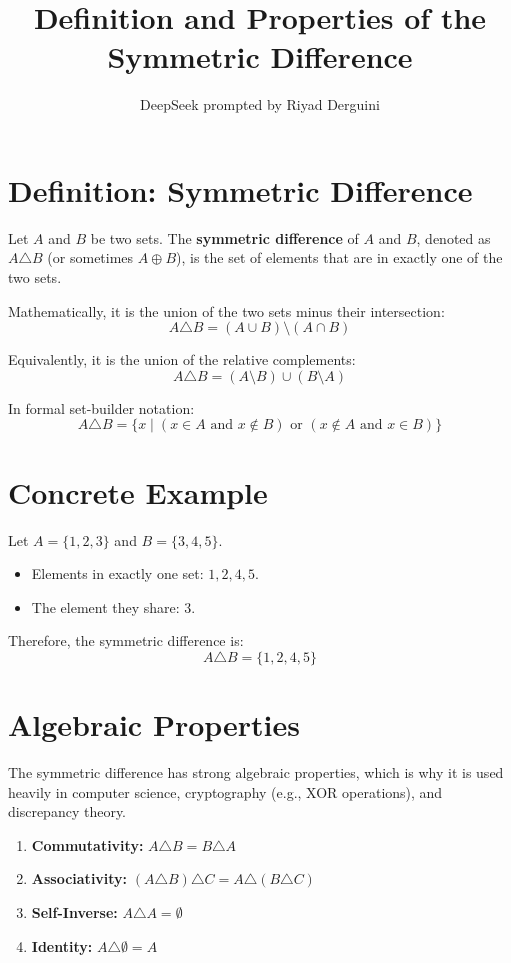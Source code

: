 \documentclass[11pt]{article}
\title{Definition and Properties of the Symmetric Difference}
\author{DeepSeek prompted by Riyad Derguini}
\date{}
\begin{document}
\maketitle

\section{Definition: Symmetric Difference}

Let \(A\) and \(B\) be two sets. The \textbf{symmetric difference} of \(A\) and \(B\), denoted as \(A \triangle B\) (or sometimes \(A \oplus B\)), is the set of elements that are in exactly one of the two sets. 

Mathematically, it is the union of the two sets minus their intersection:
\[
 A \triangle B = (A \cup B) \setminus (A \cap B) 
\]

Equivalently, it is the union of the relative complements:
\[
 A \triangle B = (A \setminus B) \cup (B \setminus A) 
\]

In formal set-builder notation:
\[
 A \triangle B = \{ x \mid (x \in A \text{ and } x \notin B) \text{ or } (x \notin A \text{ and } x \in B) \} 
\]

\hrulefill

\section{Concrete Example}

Let \(A = \{1, 2, 3\}\) and \(B = \{3, 4, 5\}\).
\begin{itemize}
    \item Elements in exactly one set: \(1, 2, 4, 5\).
    \item The element they share: \(3\).
\end{itemize}

Therefore, the symmetric difference is:
\[
 A \triangle B = \{1, 2, 4, 5\} 
\]

\hrulefill

\section{Algebraic Properties}

The symmetric difference has strong algebraic properties, which is why it is used heavily in computer science, cryptography (e.g., XOR operations), and discrepancy theory.

\begin{enumerate}
    \item \textbf{Commutativity:} \( A \triangle B = B \triangle A \)
    \item \textbf{Associativity:} \( (A \triangle B) \triangle C = A \triangle (B \triangle C) \)
    \item \textbf{Self-Inverse:} \( A \triangle A = \emptyset \)
    \item \textbf{Identity:} \( A \triangle \emptyset = A \)
\end{enumerate}
\end{document}
